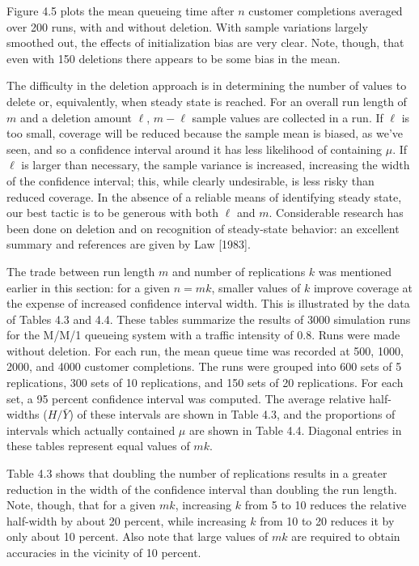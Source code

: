 Figure 4.5 plots the mean queueing time after $n$ customer completions
averaged over 200 runs, with and without deletion. With sample variations
largely smoothed out, the effects of initialization bias are very clear. Note,
though, that even with 150 deletions there appears to be some bias in the
mean.

The difficulty in the deletion approach is in determining the number of
values to delete or, equivalently, when steady state is reached. For an
overall run length of $m$ and a deletion amount $\ell$, $m-\ell$ sample values are
collected in a run. If $\ell$ is too small, coverage will be reduced because the
sample mean is biased, as we've seen, and so a confidence interval around it
has less likelihood of containing $\mu$. If $\ell$ is larger than necessary, the
sample variance is increased, increasing the width of the confidence interval;
this, while clearly undesirable, is less risky than reduced coverage. In the
absence of a reliable means of identifying steady state, our best tactic is to be
generous with both $\ell$ and $m$. Considerable research has been done on deletion
and on recognition of steady-state behavior: an excellent summary and
references are given by Law [1983].

The trade between run length $m$ and number of replications $k$ was
mentioned earlier in this section: for a given $n = mk$, smaller values of $k$
improve coverage at the expense of increased confidence interval width.
This is illustrated by the data of Tables 4.3 and 4.4. These tables summarize
the results of 3000 simulation runs for the M/M/1 queueing system with a
traffic intensity of 0.8. Runs were made without deletion. For each run, the
mean queue time was recorded at 500, 1000, 2000, and 4000 customer
completions. The runs were grouped into 600 sets of 5 replications, 300 sets of
10 replications, and 150 sets of 20 replications. For each set, a 95 percent
confidence interval was computed. The average relative half-widths
($H/\bar{Y}$) of these intervals are shown in Table 4.3, and the proportions of
intervals which actually contained $\mu$ are shown in Table 4.4. Diagonal entries
in these tables represent equal values of $mk$.



Table 4.3 shows that doubling the number of replications results in a
greater reduction in the width of the confidence interval than doubling the
run length. Note, though, that for a given $mk$, increasing $k$ from 5 to 10
reduces the relative half-width by about 20 percent, while increasing $k$ from
10 to 20 reduces it by only about 10 percent. Also note that large values of $mk$
are required to obtain accuracies in the vicinity of 10 percent.



